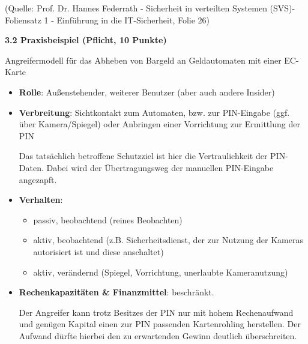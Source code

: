 \documentclass[ngerman]{fbi-aufgabenblatt}
\begin{document}
(Quelle: Prof. Dr. Hannes Federrath - Sicherheit in verteilten Systemen (SVS)-Foliensatz 1 - \dq Einführung in die IT-Sicherheit\dq , Folie 26)

\textbf{3.2 Praxisbeispiel (Pflicht, 10 Punkte)}

Angreifermodell für das Abheben von
Bargeld an Geldautomaten mit einer EC-Karte


\begin{itemize}
	\item \textbf{Rolle}: Außenstehender, weiterer Benutzer (aber auch andere Insider)\\
	\item \textbf{Verbreitung}: Sichtkontakt zum Automaten, bzw. zur PIN-Eingabe (ggf. über Kamera/Spiegel)
	oder Anbringen einer Vorrichtung zur Ermittlung der PIN
	
	Das tatsächlich betroffene Schutzziel ist hier die Vertraulichkeit der PIN-Daten. Dabei wird der Übertragungsweg der manuellen PIN-Eingabe angezapft.\\
	
	
	\item \textbf{Verhalten}: \begin{itemize} 
		\item passiv, beobachtend (reines Beobachten)
		\item aktiv, beobachtend (z.B. Sicherheitsdienst, der zur Nutzung der Kameras autorisiert ist und diese anschaltet)  
		\item aktiv, verändernd (Spiegel, Vorrichtung, unerlaubte Kameranutzung)
	\end{itemize}
	\item \textbf{Rechenkapazitäten \& Finanzmittel}: beschränkt.

	
	Der Angreifer kann trotz Besitzes der PIN nur mit hohem Rechenaufwand und genügen Kapital einen zur PIN passenden Kartenrohling herstellen. Der Aufwand dürfte hierbei den zu erwartenden Gewinn deutlich überschreiten.
	
	
\end{itemize}

%
\end{document}
